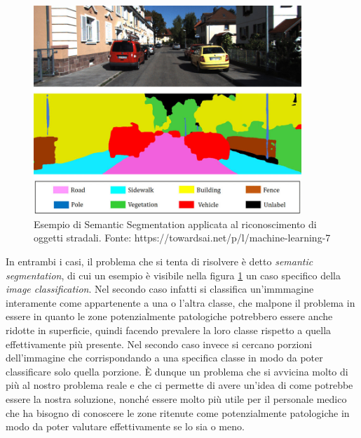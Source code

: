 \begin{figure}
    \center
    \includegraphics[width=0.9\textwidth]{./assets/semseg.jpg}
    \caption{\label{fig:semseg}Esempio di Semantic Segmentation applicata al riconoscimento di oggetti stradali. Fonte: https://towardsai.net/p/l/machine-learning-7}
\end{figure}

In entrambi i casi, il problema che si tenta di risolvere è detto
{\it semantic segmentation}, di cui un esempio è visibile nella figura \ref{fig:semseg} un caso specifico della {\it image classification}.
Nel secondo caso infatti si classifica un'immmagine interamente come
appartenente a una o l'altra classe, che malpone il problema in essere in
quanto le zone potenzialmente patologiche potrebbero essere anche ridotte
in superficie, quindi facendo prevalere la loro classe rispetto a quella
effettivamente più presente.
Nel secondo caso invece si cercano porzioni dell'immagine che corrispondando a
una specifica classe in modo da poter classificare solo quella porzione.
È dunque un problema che si avvicina molto di più al nostro problema reale
e che ci permette di avere un'idea di come potrebbe essere la nostra soluzione,
nonché essere molto più utile per il personale medico che ha bisogno
di conoscere le zone ritenute come potenzialmente patologiche in modo da
poter valutare effettivamente se lo sia o meno.




